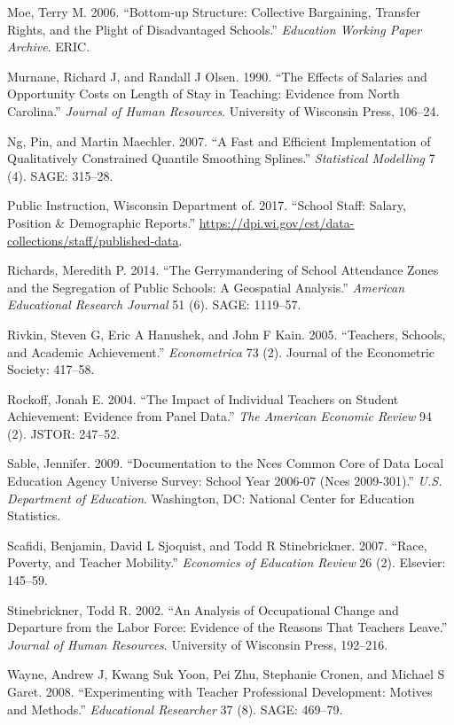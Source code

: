 \documentclass[12pt,]{article}
\begin{document}
\hypertarget{ref-moe}{}
Moe, Terry M. 2006. ``Bottom-up Structure: Collective Bargaining,
Transfer Rights, and the Plight of Disadvantaged Schools.''
\emph{Education Working Paper Archive}. ERIC.

\hypertarget{ref-murnane}{}
Murnane, Richard J, and Randall J Olsen. 1990. ``The Effects of Salaries
and Opportunity Costs on Length of Stay in Teaching: Evidence from North
Carolina.'' \emph{Journal of Human Resources}. University of Wisconsin
Press, 106--24.

\hypertarget{ref-ng}{}
Ng, Pin, and Martin Maechler. 2007. ``A Fast and Efficient
Implementation of Qualitatively Constrained Quantile Smoothing
Splines.'' \emph{Statistical Modelling} 7 (4). SAGE: 315--28.

\hypertarget{ref-dpi}{}
Public Instruction, Wisconsin Department of. 2017. ``School Staff:
Salary, Position \& Demographic Reports.''
\url{https://dpi.wi.gov/cst/data-collections/staff/published-data}.

\hypertarget{ref-richards}{}
Richards, Meredith P. 2014. ``The Gerrymandering of School Attendance
Zones and the Segregation of Public Schools: A Geospatial Analysis.''
\emph{American Educational Research Journal} 51 (6). SAGE: 1119--57.

\hypertarget{ref-rivkin}{}
Rivkin, Steven G, Eric A Hanushek, and John F Kain. 2005. ``Teachers,
Schools, and Academic Achievement.'' \emph{Econometrica} 73 (2). Journal
of the Econometric Society: 417--58.

\hypertarget{ref-rockoff}{}
Rockoff, Jonah E. 2004. ``The Impact of Individual Teachers on Student
Achievement: Evidence from Panel Data.'' \emph{The American Economic
Review} 94 (2). JSTOR: 247--52.

\hypertarget{ref-sable}{}
Sable, Jennifer. 2009. ``Documentation to the Nces Common Core of Data
Local Education Agency Universe Survey: School Year 2006-07 (Nces
2009-301).'' \emph{U.S. Department of Education}. Washington, DC:
National Center for Education Statistics.

\hypertarget{ref-scafidi}{}
Scafidi, Benjamin, David L Sjoquist, and Todd R Stinebrickner. 2007.
``Race, Poverty, and Teacher Mobility.'' \emph{Economics of Education
Review} 26 (2). Elsevier: 145--59.

\hypertarget{ref-stinebrickner}{}
Stinebrickner, Todd R. 2002. ``An Analysis of Occupational Change and
Departure from the Labor Force: Evidence of the Reasons That Teachers
Leave.'' \emph{Journal of Human Resources}. University of Wisconsin
Press, 192--216.

\hypertarget{ref-wayne}{}
Wayne, Andrew J, Kwang Suk Yoon, Pei Zhu, Stephanie Cronen, and Michael
S Garet. 2008. ``Experimenting with Teacher Professional Development:
Motives and Methods.'' \emph{Educational Researcher} 37 (8). SAGE:
469--79.
\end{document}
